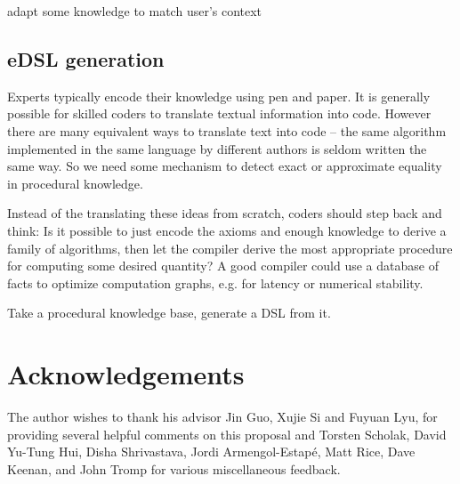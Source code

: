 \documentclass[11pt]{article}
\begin{document}
    adapt some knowledge to match user's context

    \subsection{eDSL generation}

    Experts typically encode their knowledge using pen and paper. It is generally possible for skilled coders to translate textual information into code. However there are many equivalent ways to translate text into code -- the same algorithm implemented in the same language by different authors is seldom written the same way. So we need some mechanism to detect exact or approximate equality in procedural knowledge.

    Instead of the translating these ideas from scratch, coders should step back and think: Is it possible to just encode the axioms and enough knowledge to derive a family of algorithms, then let the compiler derive the most appropriate procedure for computing some desired quantity? A good compiler could use a database of facts to optimize computation graphs, e.g. for latency or numerical stability.

    Take a procedural knowledge base, generate a DSL from it.

    \pagebreak \section{Acknowledgements}

    The author wishes to thank his advisor Jin Guo, Xujie Si and Fuyuan Lyu, for providing several helpful comments on this proposal and Torsten Scholak, David Yu-Tung Hui, Disha Shrivastava, Jordi Armengol-Estap\'e, Matt Rice, Dave Keenan, and John Tromp for various miscellaneous feedback.

    
    
\end{document}
